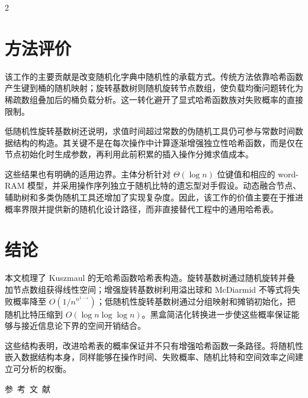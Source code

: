 \documentclass[10.5pt,compsoc,UTF8]{CjC}
\theoremstyle{mystyle}
\begin{document}
\begin{multicols}{2}
\section{\heiti 方法评价}

该工作的主要贡献是改变随机化字典中随机性的承载方式。传统方法依靠哈希函数产生键到桶的随机映射；旋转基数树则随机旋转节点数组，使负载均衡问题转化为稀疏数组叠加后的桶负载分析。这一转化避开了显式哈希函数族对失败概率的直接限制。

低随机性旋转基数树还说明，求值时间超过常数的伪随机工具仍可参与常数时间数据结构的构造。其关键不是在每次操作中计算逐渐增强独立性哈希函数，而是仅在节点初始化时生成参数，再利用此前积累的插入操作分摊求值成本。

这些结果也有明确的适用边界。主体分析针对 $\Theta(\log n)$ 位键值和相应的 word-RAM 模型，并采用操作序列独立于随机比特的遗忘型对手假设。动态融合节点、辅助树和多类伪随机工具还增加了实现复杂度。因此，该工作的价值主要在于推进概率界限并提供新的随机化设计路径，而非直接替代工程中的通用哈希表。

\section{\heiti 结论}

本文梳理了 Kuszmaul 的无哈希函数哈希表构造。旋转基数树通过随机旋转并叠加节点数组获得线性空间；增强旋转基数树利用溢出球和 McDiarmid 不等式将失败概率降至 $O(1/n^{n^{1-\varepsilon}})$；低随机性旋转基数树通过分组映射和摊销初始化，把随机比特压缩到 $O(\log n\log\log n)$。黑盒简洁化转换进一步使这些概率保证能够与接近信息论下界的空间开销结合。

这些结构表明，改进哈希表的概率保证并不只有增强哈希函数一条路径。将随机性嵌入数据结构本身，同样能够在操作时间、失败概率、随机比特和空间效率之间建立可分析的权衡。

\newpage
\vspace {5mm}
\centerline
{\textsf{参~考~文~献}}
 \addtolength{\itemsep}{-1em}
\vspace {1.5mm}



\end{multicols}
\end{document}
